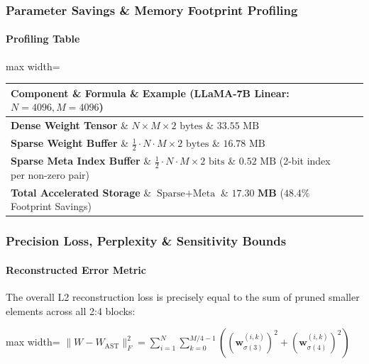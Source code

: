 \subsubsection*{Parameter Savings \& Memory Footprint Profiling}

\paragraph{Profiling Table}

\begin{center}
\begin{adjustbox}{max width=\columnwidth}
\renewcommand{\arraystretch}{1.2}
\begin{tabular}{lll}
\toprule
Component \& Formula \& Example (LLaMA-7B Linear: $N=4096, M=4096$) \\
\midrule
\textbf{Dense Weight Tensor} \& $N \times M \times 2 \text{ bytes}$ \& $33.55 \text{ MB}$ \\
\textbf{Sparse Weight Buffer} \& $\frac{1}{2} \cdot N \cdot M \times 2 \text{ bytes}$ \& $16.78 \text{ MB}$ \\
\textbf{Sparse Meta Index Buffer} \& $\frac{1}{2} \cdot N \cdot M \times 2 \text{ bits}$ \& $0.52 \text{ MB}$ (2-bit index per non-zero pair) \\
\textbf{Total Accelerated Storage} \& $\text{Sparse} + \text{Meta}$ \& $\mathbf{17.30\text{ MB}}$ ($48.4\%$ Footprint Savings) \\

\bottomrule
\end{tabular}
\end{adjustbox}
\end{center}

\subsubsection*{Precision Loss, Perplexity \& Sensitivity Bounds}

\paragraph{Reconstructed Error Metric}

The overall L2 reconstruction loss is precisely equal to the sum of pruned smaller elements across all 2:4 blocks:

\begin{center}
\begin{adjustbox}{max width=\columnwidth}
$\displaystyle
\| W - W_{\text{AST}} \|_F^2 = \sum_{i=1}^N \sum_{k=0}^{M/4 - 1} \left( \left( \mathbf{w}_{\sigma(3)}^{(i, k)} \right)^2 + \left( \mathbf{w}_{\sigma(4)}^{(i, k)} \right)^2 \right)
$
\end{adjustbox}
\end{center}

